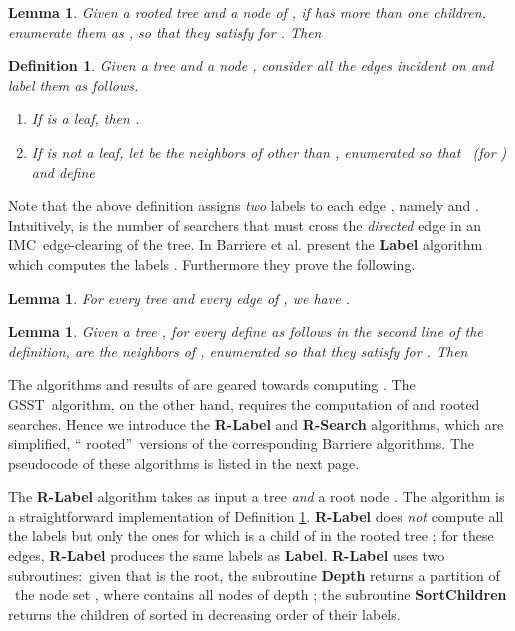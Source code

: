 \documentclass[11pt]{article}\usepackage{amsmath}
\newtheorem{definition}[theorem]{Definition}
\newtheorem{lemma}[theorem]{Lemma}
{\theoremstyle{definition}
\newtheorem{notation}[theorem]{Notation}
}
\begin{document}
\begin{lemma}
\label{prp0407}\cite{Barriere1} Given a rooted tree  and a
node  of , if  has more than one children, enumerate
them as , so that they satisfy  for . Then

\end{lemma}

\begin{definition}
\label{prp0410}\cite{Barriere1} Given a tree 
and a node , consider all the edges  incident on  and label
them as follows.

\begin{enumerate}
\item If  is a leaf, then .

\item If  is not a leaf, let  be the neighbors of
 other than , enumerated so that \ (for ) and define

\end{enumerate}
\end{definition}

Note that the above definition assigns \emph{two} labels to each edge ,
namely  and .
Intuitively,  is the number of searchers that
must cross the \emph{directed } edge in an IMC\ edge-clearing of the tree.
In \cite{Barriere1} Barriere et al. present the \textbf{Label }algorithm which
computes the labels . Furthermore they prove the following.

\begin{lemma}
\label{prp0411}\cite{Barriere1} For every tree  and every edge
 of , we have .
\end{lemma}

\begin{lemma}
\label{prp0411A}\cite{Barriere1} Given a tree , for every  define  as follows
in the second line of the definition,  are the neighbors of
, enumerated so that they satisfy  for . Then


\end{lemma}

The algorithms and results of \cite{Barriere1} are geared towards computing
. The GSST\ algorithm, on the other
hand, requires the computation of 
and rooted searches. Hence we introduce the \textbf{R-Label} and
\textbf{R-Search} algorithms, which are simplified, \textquotedblleft
rooted\textquotedblright\ versions of the corresponding Barriere algorithms.
The pseudocode of these algorithms is listed in the next page.

The \textbf{R-Label} algorithm takes as input a tree  \emph{and} a root node . The algorithm is a
straightforward implementation of Definition \ref{prp0410}. \textbf{R-Label}
does \emph{not} compute all the labels  but only the ones for which  is a child of  in the
rooted tree ; for these edges, \textbf{R-Label} produces
the same  labels as \textbf{Label}. \textbf{R-Label }uses two
subroutines:\ given that  is the root, the subroutine \textbf{Depth} returns a partition  of \ the node set , where  contains all nodes of depth ; the subroutine
\textbf{SortChildren} returns the
children of  sorted in decreasing order of their  labels.
\end{document}
